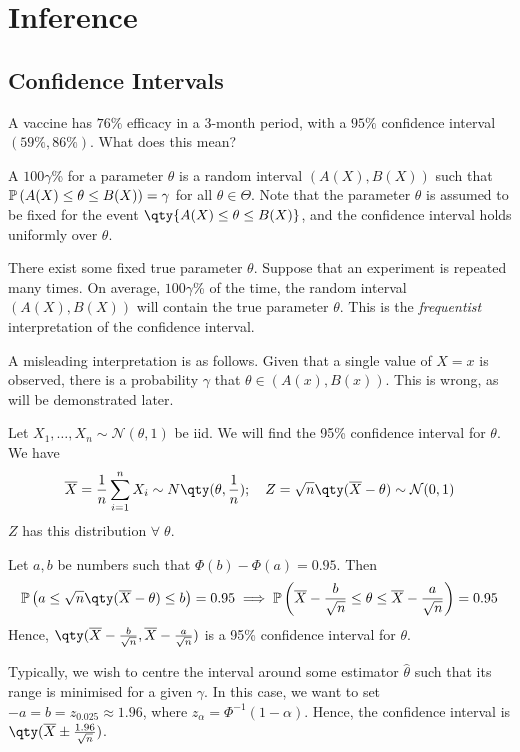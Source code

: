 \section{Inference}

\subsection{Confidence Intervals}
\begin{question}
	A vaccine has $76\%$ efficacy in a 3-month period, with a $95\%$ confidence interval $(59\%, 86\%)$. 
	What does this mean?
\end{question} 

\begin{definition}
	A $100 \gamma$\%  for a parameter $\theta$ is a random interval $(A(X), B(X))$ such that $\mathbb{P}\left({A(X) \leq \theta \leq B(X)}\right) = \gamma$ for all $\theta \in \Theta$.
	Note that the parameter $\theta$ is assumed to be fixed for the event $\qty{A(X) \leq \theta \leq B(X)}$, and the confidence interval holds uniformly over $\theta$.
\end{definition}

\begin{answer}
	There exist some fixed true parameter $\theta$.
	Suppose that an experiment is repeated many times.
	On average, $100 \gamma$\% of the time, the random interval $(A(X), B(X))$ will contain the true parameter $\theta$.
	This is the \textit{frequentist} interpretation of the confidence interval.

	A misleading interpretation is as follows.
	Given that a single value of $X = x$ is observed, there is a probability $\gamma$ that $\theta \in (A(x), B(x))$.
	This is wrong, as will be demonstrated later.
\end{answer}

\begin{example}
	Let $X_1, \dots, X_n \sim \mathcal{N}(\theta, 1)$ be iid. 
	We will find the 95\% confidence interval for $\theta$.
	We have
	\begin{align*}
		\overline X = \frac{1}{n} \sum_{i=1}^n X_i \sim N\qty(\theta, \frac{1}{n});\quad Z = \sqrt{n}\qty(\overline X - \theta) \sim \mathcal{N}(0,1)
	\end{align*}
	$Z$ has this distribution $\forall \; \theta$.

	Let $a, b$ be numbers such that $\Phi(b) - \Phi(a) = 0.95$.
	Then
	\begin{align*}
		\prob{a \leq \sqrt{n} \qty(\overline X - \theta) \leq b} = 0.95 \implies \prob{\overline X - \frac{b}{\sqrt{n}} \leq \theta \leq \overline X - \frac{a}{\sqrt{n}}} = 0.95
	\end{align*}
	Hence, $\qty(\overline X - \frac{b}{\sqrt{n}}, \overline X - \frac{a}{\sqrt{n}})$ is a 95\% confidence interval for $\theta$.
	
	Typically, we wish to centre the interval around some estimator $\hat\theta$ such that its range is minimised for a given $\gamma$.
	In this case, we want to set $-a = b = z_{0.025} \approx 1.96$, where $z_\alpha = \Phi^{-1}(1-\alpha)$.
	Hence, the confidence interval is $\qty(\overline X \pm \frac{1.96}{\sqrt{n}})$.
\end{example}

